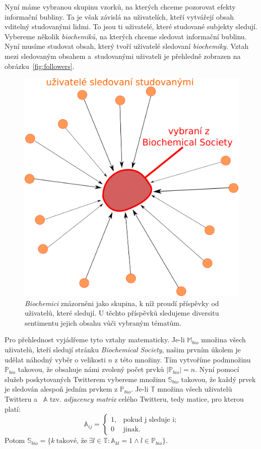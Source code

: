 \documentclass[12pt, a4paper]{article}
\numberwithin{equation}{section} 	%
\begin{document}
Nyní máme vybranou skupinu vzorků, na kterých chceme pozorovat efekty informační bubliny. Ta je však závislá na uživatelích, kteří vytvářejí obsah vditelný studovanými lidmi. To jsou ti uživatelé, které studované subjekty sledují. Vybereme několik \textit{biochemiků}, na kterých chceme sledovat informační bublinu. Nyní musíme studovat obsah, který tvoří uživatelé sledovaní \textit{biochemiky}. Vztah mezi sledovaným obsahem a~studovanými uživateli je přehledně zobrazen na obrázku~\autoref{fig:followers}.
\begin{figure}[h]
\centering
\includegraphics[scale=0.35]{./Pics/followers.png}
    \caption{\textit{Biochemici} znázorněni jako skupina, k níž proudí příspěvky od uživatelů, které sledují. U těchto příspěvků sledujeme diversitu sentimentu jejich obsahu vůči vybraným tématům.}\label{fig:followers}
\end{figure}

Pro přehlednost vyjádřeme tyto vztahy matematicky. Je-li $\mathbb{M}_{bio}$ množina všech uživatelů, kteří sledují stránku \textit{Biochemical Society}, našim prvním úkolem je udělat náhodný vyběr o velikosti $n$ z této množiny. Tím vytvoříme podmnožinu $\mathbb{P}_{bio}$ takovou, že obsahuje námi zvolený počet prvků $\left\vert{\mathbb{P}_{bio}}\right\vert = n$. Nyní pomocí služeb poskytovaných Twitterem vybereme množinu $\mathbb{S}_{bio}$ takovou, že každý prvek je sledován alespoň jedním prvkem z $\mathbb{P}_{bio}$. Je-li $\mathbb{T}$ množina všech uživatelů Twitteru a~ $\mathbb{A}$ tzv. \textit{adjacency matrix} celého Twitteru, tedy matice, pro kterou platí:
\begin{equation}
    \mathbb{A}_{ij}=
    \begin{cases}
        1, &\text{pokud j sleduje i;}\\
        0 &\text{jinak.}
    \end{cases}
\end{equation}
Potom $\mathbb{S}_{bio} = \{k\ \text{takové, že}\ \exists l\in\mathbb{T}: \mathbb{A}_{kl} = 1 \wedge l\in\mathbb{P}_{bio} \}$.
\end{document}
